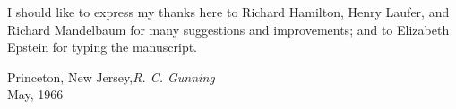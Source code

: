 I should like to express my thanks here to Richard Hamilton, Henry Laufer, and Richard Mandelbaum for many suggestions and improvements; and to Elizabeth Epstein for typing the manuscript.

 

 \vspace{\baselineskip}
 \begin{flushright}\noindent
 Princeton, New Jersey,\hfill {\it R. C. Gunning}\\
 May, 1966 \hfill \\
 \end{flushright}


